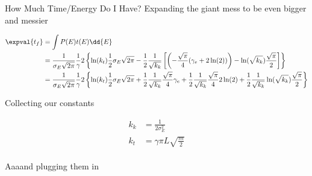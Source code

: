 \begin{answer}
\begin{answerpart}{How Much Time/Energy Do I Have?}
    Expanding the giant mess to be even bigger and messier

    \begin{equation}
      \begin{alignedat}{2}
        &&\expval{t_f}
        &= \int P(E)t(E) \dd{E}\\
        &&&=
        \frac{1}{\sigma_E\sqrt{2\pi}}
        \frac{1}{\gamma}
        2
        \left\{
        \ln(k_t)
        \frac{1}{2}\sigma_E\sqrt{2\pi}
        -
        \frac{1}{2}
        \frac{1}{\sqrt{k_k}}
        \left[
          \left(
          -\frac{\sqrt{\pi}}{4}(\gamma_e + 2\ln(2))
          \right)
        -
        \ln(\sqrt{k_k})
        \frac{\sqrt{\pi}}{2}
        \right]
        \right\}
        \\
        &&&=
        \frac{1}{\sigma_E\sqrt{2\pi}}
        \frac{1}{\gamma}
        2
        \left\{
        \ln(k_t)
        \frac{1}{2}\sigma_E\sqrt{2\pi}
        +
        \frac{1}{2}
        \frac{1}{\sqrt{k_k}}
        \frac{\sqrt{\pi}}{4}
        \gamma_e
        +
        \frac{1}{2}
        \frac{1}{\sqrt{k_k}}
        \frac{\sqrt{\pi}}{4}
        2\ln(2)
        +
        \frac{1}{2}
        \frac{1}{\sqrt{k_k}}
        \ln(\sqrt{k_k})
        \frac{\sqrt{\pi}}{2}
        \right\}
        \\
      \end{alignedat}
    \end{equation}

    Collecting our constants

    \begin{equation}
      \begin{split}
        k_k &= \frac{1}{2\sigma_E^2}\\
        k_t &= \gamma \pi L \sqrt{\frac{m}{2}}\\
      \end{split}
    \end{equation}

    Aaaand plugging them in
    

\end{answerpart}
\end{answer}
